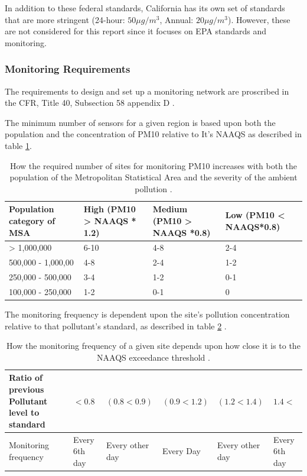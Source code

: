 \documentclass{article}
\begin{document}
	In addition to these federal standards, California has its own set of standards that are more stringent (24-hour: $50 \mu g/m^3$, Annual: $20 \mu g/m^3$).  However, these are not considered for this report since it focuses on \ac{EPA} standards and monitoring.
	
	\subsubsection*{Monitoring Requirements}\label{subsubsec:monreqs}
	The requirements to design and set up a monitoring network are proscribed in the \ac{CFR}, Title 40, Subsection 58 appendix D \citep{CFR:Title40-58}.
	
	The minimum number of sensors for a given region is based upon both the population and the concentration of \ac{PM10} relative to It's \ac{NAAQS} as described in table \ref{tab:NAAQS_site_count}.
	\begin{table}[ht]
		\centering
		\begin{tabular}{p{}|p{}|p{}|p{}}
			Population category of \ac{MSA} & High (PM10 > \ac{NAAQS} * 1.2) & Medium (PM10 > \ac{NAAQS} *0.8) & Low (PM10 < \ac{NAAQS}*0.8) \\
			\hline
			> 1,000,000 & 6-10 & 4-8 & 2-4 \\
			500,000 - 1,000,00 & 4-8 & 2-4 & 1-2 \\
			250,000 - 500,000 & 3-4 & 1-2 & 0-1 \\
			100,000 - 250,000 & 1-2 & 0-1 & 0 \\
		\end{tabular}
		\caption{How the required number of sites for monitoring PM10 increases with both the population of the Metropolitan Statistical Area and the severity of the ambient pollution \citep{CFR:Title40-58}. }
		\label{tab:NAAQS_site_count}
	\end{table}
	
	The monitoring frequency is dependent upon the site's pollution concentration relative to that pollutant's standard, as described in table \ref{tab:EPA_monitoring_freq}  \citep{AQMNP:2019}.
	
	\begin{table}[ht]
		\centering
		\begin{tabular}{p{}|p{}|p{}|p{}|p{}|p{}}
			Ratio of previous Pollutant level to standard & $<0.8$ & $(0.8 < 0.9)$ & $(0.9 < 1.2)$ & $(1.2 < 1.4)$ & $1.4<$  \\
			\hline
			Monitoring frequency & Every 6th day & Every other day & Every Day & Every other day & Every 6th day \\ 
		\end{tabular}
		\caption{How the monitoring frequency of a given site depends upon how close it is to the \ac{NAAQS} exceedance threshold \citep{AQMNP:2019}.}
		\label{tab:EPA_monitoring_freq}
	\end{table}
	
\end{document}
